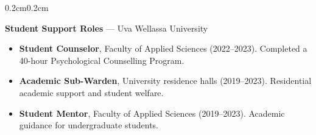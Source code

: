 \documentclass[10pt, letterpaper]{article}
\newenvironment{highlights}{%
    \begin{itemize}[topsep=0.08cm, parsep=0.08cm, partopsep=0pt,
                    itemsep=0pt, leftmargin=0.4cm + 10pt]
}{\end{itemize}}
\newenvironment{onecolentry}{%
    \begin{adjustwidth}{0.2cm}{0.2cm}
}{\end{adjustwidth}}
\begin{document}
\begin{onecolentry}
    \textbf{Student Support Roles} --- Uva Wellassa University
    \begin{highlights}
        \item \textbf{Student Counselor}, Faculty of Applied Sciences (2022--2023).
              Completed a 40-hour Psychological Counselling Program.
        \item \textbf{Academic Sub-Warden}, University residence halls (2019--2023).
              Residential academic support and student welfare.
        \item \textbf{Student Mentor}, Faculty of Applied Sciences (2019--2023).
              Academic guidance for undergraduate students.
    \end{highlights}
\end{onecolentry}
\vspace{0.18cm}

\end{document}
